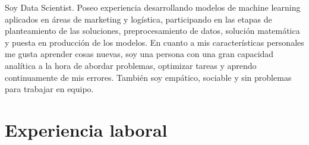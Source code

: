 \documentclass[11pt,a4paper,sans]{moderncv}        %
\begin{document}
\makecvtitle

\small{Soy Data Scientist. Poseo experiencia desarrollando modelos de machine learning aplicados en áreas de marketing y logística, participando en las etapas de planteamiento de las soluciones, preprocesamiento de datos, solución matemática y puesta en producción de los modelos.
En cuanto a mis características personales me gusta aprender cosas nuevas, soy una persona con una gran capacidad analítica a la hora de abordar problemas, optimizar tareas y aprendo continuamente de mis errores. También soy empático, sociable y sin problemas para trabajar en equipo.}

\section{Experiencia laboral}

\vspace{6pt}
\end{document}
